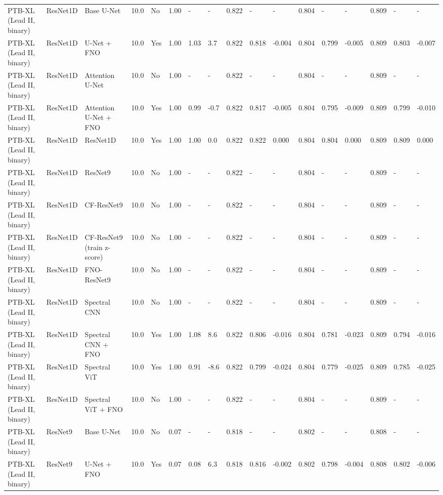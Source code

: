 \begin{longtable}{lllllllllllllllll}
PTB-XL (Lead II, binary) & ResNet1D & Base U-Net & 10.0 & No & 1.00 & - & - & 0.822 & - & - & 0.804 & - & - & 0.809 & - & - \\
PTB-XL (Lead II, binary) & ResNet1D & U-Net + FNO & 10.0 & Yes & 1.00 & 1.03 & 3.7 & 0.822 & 0.818 & -0.004 & 0.804 & 0.799 & -0.005 & 0.809 & 0.803 & -0.007 \\
PTB-XL (Lead II, binary) & ResNet1D & Attention U-Net & 10.0 & No & 1.00 & - & - & 0.822 & - & - & 0.804 & - & - & 0.809 & - & - \\
PTB-XL (Lead II, binary) & ResNet1D & Attention U-Net + FNO & 10.0 & Yes & 1.00 & 0.99 & -0.7 & 0.822 & 0.817 & -0.005 & 0.804 & 0.795 & -0.009 & 0.809 & 0.799 & -0.010 \\
PTB-XL (Lead II, binary) & ResNet1D & ResNet1D & 10.0 & Yes & 1.00 & 1.00 & 0.0 & 0.822 & 0.822 & 0.000 & 0.804 & 0.804 & 0.000 & 0.809 & 0.809 & 0.000 \\
PTB-XL (Lead II, binary) & ResNet1D & ResNet9 & 10.0 & No & 1.00 & - & - & 0.822 & - & - & 0.804 & - & - & 0.809 & - & - \\
PTB-XL (Lead II, binary) & ResNet1D & CF-ResNet9 & 10.0 & No & 1.00 & - & - & 0.822 & - & - & 0.804 & - & - & 0.809 & - & - \\
PTB-XL (Lead II, binary) & ResNet1D & CF-ResNet9 (train z-score) & 10.0 & No & 1.00 & - & - & 0.822 & - & - & 0.804 & - & - & 0.809 & - & - \\
PTB-XL (Lead II, binary) & ResNet1D & FNO-ResNet9 & 10.0 & No & 1.00 & - & - & 0.822 & - & - & 0.804 & - & - & 0.809 & - & - \\
PTB-XL (Lead II, binary) & ResNet1D & Spectral CNN & 10.0 & No & 1.00 & - & - & 0.822 & - & - & 0.804 & - & - & 0.809 & - & - \\
PTB-XL (Lead II, binary) & ResNet1D & Spectral CNN + FNO & 10.0 & Yes & 1.00 & 1.08 & 8.6 & 0.822 & 0.806 & -0.016 & 0.804 & 0.781 & -0.023 & 0.809 & 0.794 & -0.016 \\
PTB-XL (Lead II, binary) & ResNet1D & Spectral ViT & 10.0 & Yes & 1.00 & 0.91 & -8.6 & 0.822 & 0.799 & -0.024 & 0.804 & 0.779 & -0.025 & 0.809 & 0.785 & -0.025 \\
PTB-XL (Lead II, binary) & ResNet1D & Spectral ViT + FNO & 10.0 & No & 1.00 & - & - & 0.822 & - & - & 0.804 & - & - & 0.809 & - & - \\
PTB-XL (Lead II, binary) & ResNet9 & Base U-Net & 10.0 & No & 0.07 & - & - & 0.818 & - & - & 0.802 & - & - & 0.808 & - & - \\
PTB-XL (Lead II, binary) & ResNet9 & U-Net + FNO & 10.0 & Yes & 0.07 & 0.08 & 6.3 & 0.818 & 0.816 & -0.002 & 0.802 & 0.798 & -0.004 & 0.808 & 0.802 & -0.006 \\

\end{longtable}
